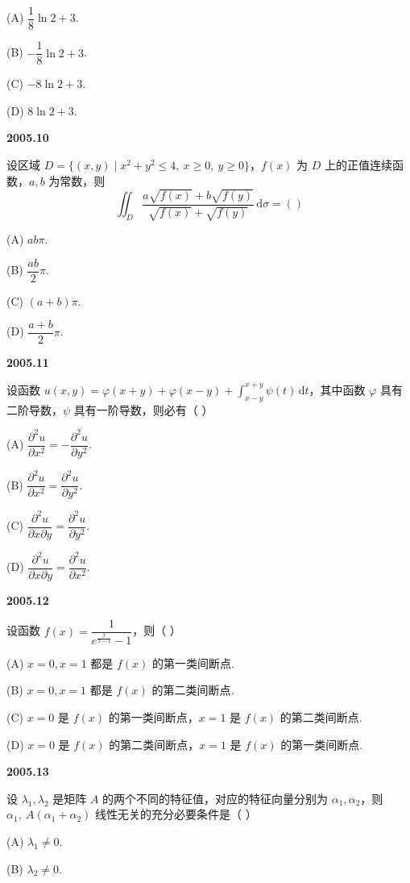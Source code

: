 \documentclass[UTF8,12pt,fontset=windows]{ctexart}
\begin{document}
(A) $\dfrac{1}{8}\ln 2 + 3$.

(B) $-\dfrac{1}{8}\ln 2 + 3$.

(C) $-8\ln 2 + 3$.

(D) $8\ln 2 + 3$.

\vfill
\newpage
{\large\bfseries 2005.10}

设区域 $D = \{(x,y) \mid x^2+y^2 \leqslant 4,\ x \geqslant 0,\ y \geqslant 0\}$，$f(x)$ 为 $D$ 上的正值连续函数，$a,b$ 为常数，则
$$\iint_D \frac{a\sqrt{f(x)} + b\sqrt{f(y)}}{\sqrt{f(x)} + \sqrt{f(y)}}\,\mathrm{d}\sigma =( )$$

(A) $ab\pi$.

(B) $\dfrac{ab}{2}\pi$.

(C) $(a+b)\pi$.

(D) $\dfrac{a+b}{2}\pi$.

\vfill
\newpage
{\large\bfseries 2005.11}

设函数 $u(x,y) = \varphi(x+y) + \varphi(x-y) + \displaystyle\int_{x-y}^{x+y}\psi(t)\,\mathrm{d}t$，其中函数 $\varphi$ 具有二阶导数，$\psi$ 具有一阶导数，则必有（ ）

(A) $\dfrac{\partial^2 u}{\partial x^2} = -\dfrac{\partial^2 u}{\partial y^2}$.

(B) $\dfrac{\partial^2 u}{\partial x^2} = \dfrac{\partial^2 u}{\partial y^2}$.

(C) $\dfrac{\partial^2 u}{\partial x \partial y} = \dfrac{\partial^2 u}{\partial y^2}$.

(D) $\dfrac{\partial^2 u}{\partial x \partial y} = \dfrac{\partial^2 u}{\partial x^2}$.

\vfill
\newpage
{\large\bfseries 2005.12}

设函数 $f(x) = \dfrac{1}{e^{\frac{x}{x-1}}-1}$，则（ ）

(A) $x = 0, x = 1$ 都是 $f(x)$ 的第一类间断点.

(B) $x = 0, x = 1$ 都是 $f(x)$ 的第二类间断点.

(C) $x = 0$ 是 $f(x)$ 的第一类间断点，$x = 1$ 是 $f(x)$ 的第二类间断点.

(D) $x = 0$ 是 $f(x)$ 的第二类间断点，$x = 1$ 是 $f(x)$ 的第一类间断点.

\vfill
\newpage
{\large\bfseries 2005.13}

设 $\lambda_1,\lambda_2$ 是矩阵 $A$ 的两个不同的特征值，对应的特征向量分别为 $\alpha_1,\alpha_2$，则 $\alpha_1,\ A(\alpha_1+\alpha_2)$ 线性无关的充分必要条件是（ ）

(A) $\lambda_1 \neq 0$.

(B) $\lambda_2 \neq 0$.
\end{document}
